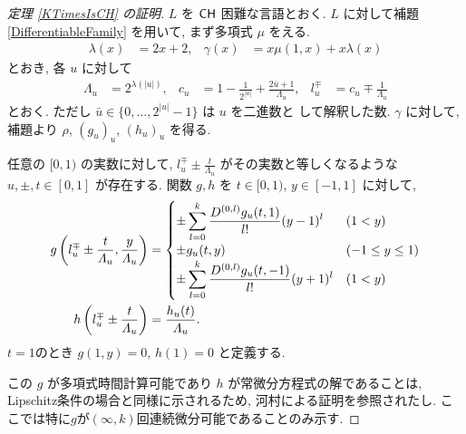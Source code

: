 \begin{proof}[\rm 定理 \ref{KTimesIsCH} の証明]
 $L$ を $\mathsf{CH}$ 困難な言語とおく.
 $L$ に対して補題 \ref{DifferentiableFamily} を用いて,
 まず多項式 $\mu$ をえる.
 \begin{align}
  \lambda(x) &= 2x + 2,&
  \gamma(x) &= x\mu(1, x) + x \lambda(x)
 \end{align}
 とおき, 各 $u$ に対して 
\begin{align}
 \Lambda_u 
 &= 2^{\lambda(|u|)}, &
 c_u 
 &= 1-\frac{1}{2^{|u|}}+\frac{2\bar{u}+1}{\Lambda_u}, &
 l_u^\mp 
 &= c_u\mp\frac{1}{\varLambda_u} 
\end{align}  
 とおく. ただし $\bar u \in \{0, \dots, 2^{|u|} - 1\}$ は $u$ を二進数と
 して解釈した数.
 $\gamma$ に対して, 補題より $\rho$, $(g_u)_u$, $(h_u)_u$ を得る.


 任意の $[0,1)$ の実数に対して,
 $l^\mp_u \pm \frac{t}{\Lambda_u}$ がその実数と等しくなるような
 $u, \pm, t\in [0,1]$ が存在する.
 関数 $g, h$ を $t \in [0,1)$, $y \in [-1, 1]$ に対して,
 \begin{align}
 g \left(l^\mp_u \pm \frac{t}{\varLambda_u}, \frac{y}{\varLambda_u}\right)
  &= \begin{cases}
      \pm \displaystyle \sum_{l=0}^k \frac{D^{(0,l)}g_u(t,1)}{l!} (y-1)^l 
      &  (1<y) \\
      \pm g_u(t, y)      & (-1 \le y \le 1) \\
      \pm \displaystyle \sum_{l=0}^k \frac{D^{(0,l)}g_u(t,-1)}{l!} (y+1)^l  
      &  (1<y) \\
    \end{cases} 
  \\
 h \left( l^\mp_u \pm \frac{t}{\varLambda_u} \right) 
  & = \frac{h_u(t)}{\varLambda_u}.
\end{align}
 $t=1$のとき $g(1,y) = 0$, $h(1) = 0$ と定義する.

 この $g$ が多項式時間計算可能であり $h$ が常微分方程式の解であることは,
 Lipschitz条件の場合と同様に示されるため,
 河村による証明を参照されたし\cite[定理3.2]{kawamura2010lipschitz}.
 ここでは特に$g$が$(\infty, k)$回連続微分可能であることのみ示す.


\end{proof}
